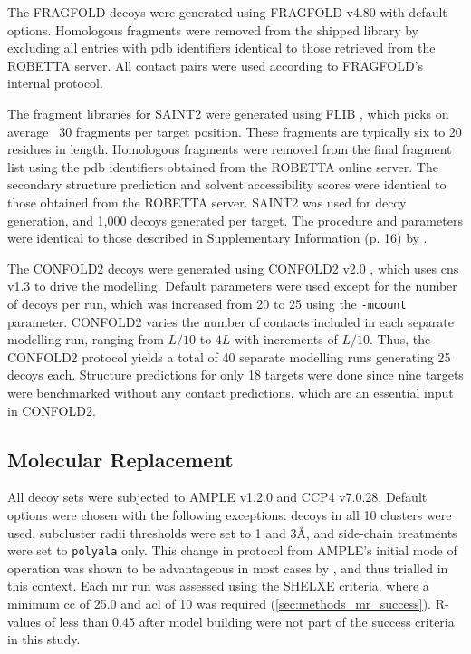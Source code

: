 The FRAGFOLD decoys were generated using FRAGFOLD v4.80 \cite{Jones2001-mc} with default options. Homologous fragments were removed from the shipped library  by excluding all entries with \gls{pdb} identifiers identical to those retrieved from the ROBETTA server. All contact pairs were used according to FRAGFOLD's internal protocol.

The fragment libraries for SAINT2 were generated using FLIB \cite{De_Oliveira2015-kb}, which picks on average ~30 fragments per target position. These fragments are typically six to 20 residues in length. Homologous fragments were removed from the final fragment list using the \gls{pdb} identifiers obtained from the ROBETTA online server. The secondary structure prediction and solvent accessibility scores were identical to those obtained from the ROBETTA server. SAINT2 was used for decoy generation, and 1,000 decoys generated per target. The procedure and parameters were identical to those described in Supplementary Information (p. 16) by \textcite{De_Oliveira2018-sg}.

The CONFOLD2 decoys were generated using CONFOLD2 v2.0 \cite{Adhikari2018-lj}, which uses \gls{cns} v1.3 \cite{Brunger1998-sz} to drive the modelling. Default parameters were used except for the number of decoys per run, which was increased from 20 to 25 using the \texttt{-mcount} parameter. CONFOLD2 varies the number of contacts included in each separate modelling run, ranging from $L/10$ to $4L$ with increments of $L/10$. Thus, the CONFOLD2 protocol yields a total of 40 separate modelling runs generating 25 decoys each. Structure predictions for only 18 targets were done since nine targets were benchmarked without any contact predictions, which are an essential input in CONFOLD2.

\subsection{Molecular Replacement}
All decoy sets were subjected to AMPLE v1.2.0 and CCP4 v7.0.28. Default options were chosen with the following exceptions: decoys in all 10 clusters were used, subcluster radii thresholds were set to 1 and 3\AA, and side-chain treatments were set to \texttt{polyala} only. This change in protocol from AMPLE's initial mode of operation \cite{Bibby2012-lm} was shown to be advantageous in most cases by \textcite{Thomas2017-qu}, and thus trialled in this context.  Each \gls{mr} run was assessed using the SHELXE criteria, where a minimum \gls{cc} of 25.0 and \gls{acl} of 10 was required (\cref{sec:methods_mr_success}). R-values of less than 0.45 after model building were not part of the success criteria in this study.

